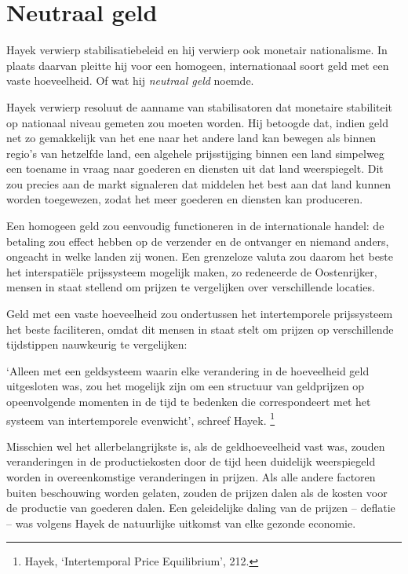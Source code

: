 \documentclass[
  a5paper,
  smalldemyvopaper,11pt,twoside,onecolumn,openright,extrafontsizes]{memoir}
\begin{document}
\section{Neutraal geld}\label{neutraal-geld-1}

Hayek verwierp stabilisatiebeleid en hij verwierp ook monetair
nationalisme. In plaats daarvan pleitte hij voor een homogeen,
internationaal soort geld met een vaste hoeveelheid. Of wat hij
\emph{neutraal geld} noemde.

Hayek verwierp resoluut de aanname van stabilisatoren dat monetaire
stabiliteit op nationaal niveau gemeten zou moeten worden. Hij betoogde
dat, indien geld net zo gemakkelijk van het ene naar het andere land kan
bewegen als binnen regio's van hetzelfde land, een algehele
prijsstijging binnen een land simpelweg een toename in vraag naar
goederen en diensten uit dat land weerspiegelt. Dit zou precies aan de
markt signaleren dat middelen het best aan dat land kunnen worden
toegewezen, zodat het meer goederen en diensten kan produceren.

Een homogeen geld zou eenvoudig functioneren in de internationale
handel: de betaling zou effect hebben op de verzender en de ontvanger en
niemand anders, ongeacht in welke landen zij wonen. Een grenzeloze
valuta zou daarom het beste het interspatiële prijssysteem mogelijk
maken, zo redeneerde de Oostenrijker, mensen in staat stellend om
prijzen te vergelijken over verschillende locaties.

Geld met een vaste hoeveelheid zou ondertussen het intertemporele
prijssysteem het beste faciliteren, omdat dit mensen in staat stelt om
prijzen op verschillende tijdstippen nauwkeurig te vergelijken:

`Alleen met een geldsysteem waarin elke verandering in de hoeveelheid
geld uitgesloten was, zou het mogelijk zijn om een structuur van
geldprijzen op opeenvolgende momenten in de tijd te bedenken die
correspondeert met het systeem van intertemporele evenwicht', schreef
Hayek. \footnote{\hspace{0pt}Hayek, `Intertemporal Price Equilibrium',
  212.}

Misschien wel het allerbelangrijkste is, als de geldhoeveelheid vast
was, zouden veranderingen in de productiekosten door de tijd heen
duidelijk weerspiegeld worden in overeenkomstige veranderingen in
prijzen. Als alle andere factoren buiten beschouwing worden gelaten,
zouden de prijzen dalen als de kosten voor de productie van goederen
dalen. Een geleidelijke daling van de prijzen -- deflatie -- was volgens
Hayek de natuurlijke uitkomst van elke gezonde economie.
\end{document}

